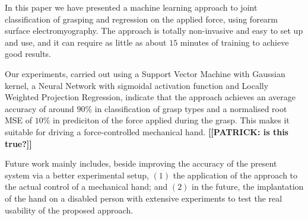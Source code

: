 In this paper we have presented a machine learning approach to
joint classification of grasping and regression on the applied force,
using forearm surface electromyography. The approach is totally
non-invasive and easy to set up and use, and it can require as little
as about $15$ minutes of training to achieve good results.

Our experiments, carried out using a Support Vector Machine with
Gaussian kernel, a Neural Network with sigmoidal activation function
and Locally Weighted Projection Regression, indicate that the approach
achieves an average accuracy of around $90\%$ in classification of
grasp types and a normalised root MSE of $10\%$ in prediciton of the
force applied during the grasp. This makes it suitable for driving a
force-controlled mechanical hand. \textbf{[[PATRICK: is this true?]]}

Future work mainly includes, beside improving the accuracy of the present
system via a better experimental setup, $(1)$ the application of the
approach to the actual control of a mechanical hand; and $(2)$ in the
future, the implantation of the hand on a disabled person with
extensive experiments to test the real usability of the proposed
approach.
